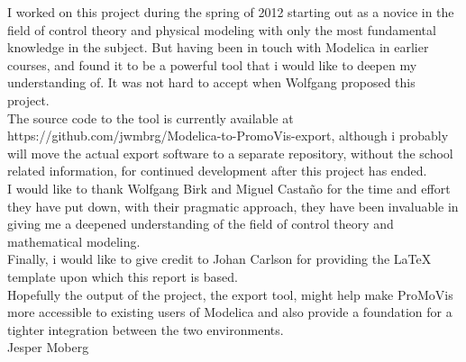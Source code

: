 I worked on this project during the spring of 2012 starting out as a novice in the field of control theory and physical modeling with only the most fundamental knowledge in the subject. But having been in touch with Modelica in earlier courses, and found it to be a powerful tool that i would like to deepen my understanding of. It was not hard to accept when Wolfgang proposed this project.\\\newline The source code to the tool is currently available at https://github.com/jwmbrg/Modelica-to-PromoVis-export, although i probably will move the actual export software to a separate repository, without the school related information, for continued development after this project has ended.\\\newline I would like to thank Wolfgang Birk and Miguel Casta{\~{n}}o for the time and effort they have put down,  with their pragmatic approach, they have been invaluable in giving me a deepened understanding of the field of control theory and mathematical modeling.\\\newline Finally, i would like to give credit to Johan Carlson for providing the \LaTeX{} template upon which this report is based. \\\newline Hopefully the output of the project, the export tool, might help make ProMoVis more accessible to existing users of Modelica and also provide a foundation for a tighter integration between the two environments.\\\newline
\vspace*{2cm}%
\hfill Jesper Moberg
